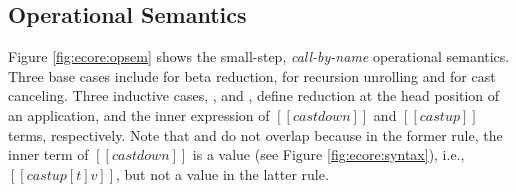 \begin{comment}
\paragraph{Syntactic Sugar}
Figure \ref{fig:ecore:syntax} also shows the syntactic sugar used in \ecore.
By convention, we use $[[t1 -> t2]]$ to represent 
$[[Pi x:t1.t2]]$ if $[[x]]$ does not occur free in $[[t2]]$. 

We use $[[foldn]]$ and $[[unfoldn]]$ to denote
$n$ consecutive cast operators. $[[foldn]]$ is simplified to only take
one type parameter, i.e., the last type $[[t1]]$ of the $n$ cast operations.
Due to the decidability of one-step reduction (see Section 
\ref{sec:ecore:meta}), the intermediate types can be uniquely determined, 
thus can be left out from the $[[foldn]]$ operator.
\end{comment}

\subsection{Operational Semantics}\label{sec:ecore:opsem}

Figure \ref{fig:ecore:opsem} shows the small-step, \emph{call-by-name} operational
semantics. Three base cases include
 for beta reduction, 
for recursion unrolling and  for cast canceling.
Three inductive cases, ,
 and , define reduction at the head position of an
application, and the inner expression of $[[castdown]]$ and
$[[castup]]$ terms, respectively.
Note that  and  do not
overlap because in the former rule, the inner term of $[[castdown]]$
is a value (see Figure \ref{fig:ecore:syntax}), i.e., $[[castup [t] v]]$,
but not a value in the latter rule.

